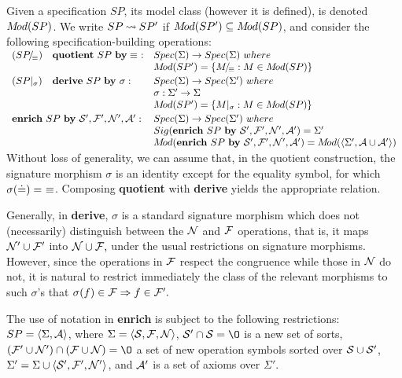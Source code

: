 Given a specification $SP$, its model class (however it is defined), is denoted $M\!od(SP)$.
We write $SP\mathbin{\leadsto} SP'$ if $M\!od(SP')\subseteq M\!od(SP)$, and consider the following specification-building operations:\\[1ex] \(\begin{array}{lll}
(\quot{SP}\equiv) & {\bf quotient\ } SP\ {\bf by}\equiv\ : 
& Spec(\Sigma)\into Spec(\Sigma)\ where \\ & & \Mod(SP') = \{\quot M\equiv : M\in \Mod(SP)\} \\[.5ex] (SP|_\sigma) & {\bf derive}\ SP\ {\bf by\ }\sigma : 
& Spec(\Sigma)\into Spec(\Sigma')\ where \\ & & \sigma: \Sigma'\into\Sigma \\
& & \Mod(SP') = \{ M|_\sigma : M\in \Mod(SP)\} \\[.5ex] %
\multicolumn{2}{l}{\enrich{SP}{\Sorts',\Funcs', {\cal N}',\Axs'}:} 
& Spec(\Sigma)\into Spec(\Sigma') \ where\\ & & Sig(\enrich{SP}{\Sorts',\Funcs', {\cal N}',\Axs'}) = \Sigma' \\ & & \Mod(\enrich{SP}{\Sorts',\Funcs', {\cal N}',\Axs'}) = 
\Mod(\<\Sigma',\Axs\cup\Axs'\>)
\end{array} \) \\[1ex]



Without loss of generality, we can assume that, in the quotient construction, the signature morphism $\sigma$ is an identity except for the equality symbol, for which $\sigma(\mathbin{\doteq})=\ \equiv$. Composing {\bf quotient} with {\bf derive} yields the appropriate relation.

Generally, in {\bf derive}, $\sigma$ is a standard signature morphism which does
not (necessarily)
distinguish between the $\cal N$ and ${\cal F}$ operations, that is, it maps $\cal N' \cup {\cal F}'$ into $\cal N \cup {\cal F},$ under the usual restrictions
on signature morphisms. However, since the operations in ${\cal F}$ respect the congruence while those in
$\cal N$ do not, it is natural to restrict immediately the class of the relevant morphisms to such $\sigma$'s that $\sigma(f)\in{\cal F}\mathrel\Rightarrow f\in{\cal F}'.$

The use of notation in {\bf enrich} is subject to the following restrictions: $SP =\langle\Sigma,{\cal A}\rangle$, where $\Sigma =
\langle{\cal S},{\cal F}, {\cal N}\rangle$, $\Sorts'\cap\Sorts =\es$ is a new set of sorts, $(\Funcs'\cup {\cal N}')\cap (\Funcs\cup {\cal N}) =\es$ 
a set of new operation symbols sorted over ${\cal S}\cup{\cal S}'$, $\Sigma'= \Sigma\cup\langle{\cal S}',{\cal F}', {\cal N}'\rangle$, and ${\cal A}'$ is a set of axioms over $\Sigma'$.

